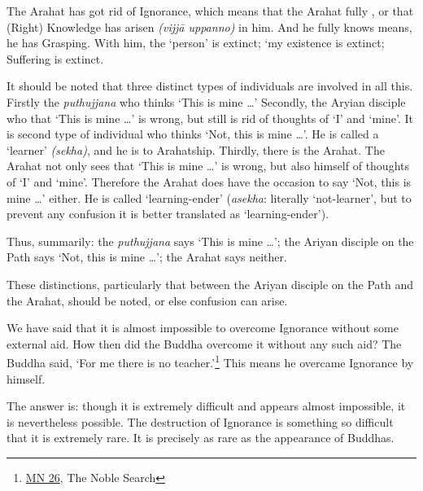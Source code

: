 The Arahat has got rid of Ignorance, which means that the Arahat fully , or that (Right) Knowledge has arisen \emph{(vijjā uppanno)} in him. And he fully knows means, he has  Grasping. With him, the `person' is extinct; `my existence is extinct; Suffering is extinct.

It should be noted that three distinct types of individuals are involved in all this. Firstly the \emph{puthujjana} who thinks `This is mine \ldots\hspace{0pt}' Secondly, the Aryian disciple who  that `This is mine \ldots\hspace{0pt}' is wrong, but still is  rid of thoughts of `I' and `mine'. It is  second type of individual who thinks `Not, this is mine \ldots\hspace{0pt}'. He is called a `learner' \emph{(sekha)}, and he is  to Arahatship. Thirdly, there is the Arahat. The Arahat not only sees that `This is mine \ldots\hspace{0pt}' is wrong, but also  himself of thoughts of `I' and `mine'. Therefore the Arahat does  have the occasion to say `Not, this is mine \ldots\hspace{0pt}' either. He is called `learning-ender' (\emph{asekha}: literally `not-learner', but to prevent any confusion it is better translated as `learning-ender').

Thus, summarily: the \emph{puthujjana} says `This is mine \ldots\hspace{0pt}'; the Ariyan disciple on the Path says `Not, this is mine \ldots\hspace{0pt}'; the Arahat says neither.

These distinctions, particularly that between the Ariyan disciple on the Path and the Arahat, should be noted, or else confusion can arise.

We have said that it is almost impossible to overcome Ignorance without some external aid. How then did the Buddha overcome it without any such aid? The Buddha said, `For me there is no teacher.'\footnote{\href{https://suttacentral.net/mn26/en/bodhi}{MN 26}, The Noble Search} This means he overcame Ignorance by himself.

The answer is: though it is extremely difficult and appears almost impossible, it is nevertheless possible. The destruction of Ignorance  is something so difficult that it is extremely rare. It is precisely as rare as the appearance of Buddhas.
